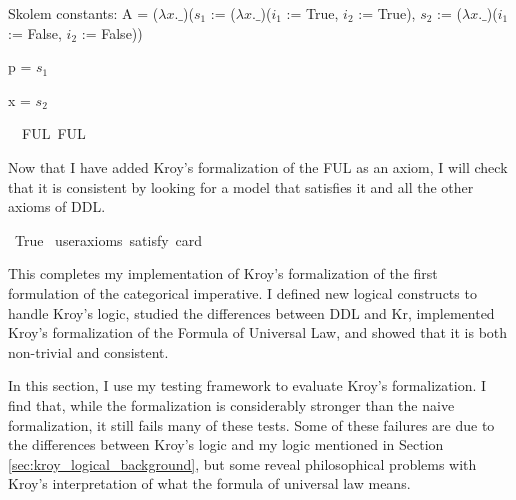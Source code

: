 \begin{isabellebody}
{  Skolem constants:
    A = ($\lambda x. \_$)($s_1$ := ($\lambda x. \_$)($i_1$ := True, $i_2$ := True), $s_2$ := ($\lambda x. \_$)($i_1$ := False, $i_2$ := False))
    
p = $s_1$
    
x = $s_2$\color{black}%
}%
\endisatagproof
{\isafoldproof}%
%
\isadelimproof
%
\endisadelimproof
\isanewline
\isanewline
{}\isamarkupfalse%
\ \ FUL{\isacharcolon}\ FUL%
\begin{isamarkuptext}%
Now that I have added Kroy's formalization of the FUL as an axiom, I will check that it is 
consistent by looking for a model that satisfies it and all the other axioms of DDL.%
\end{isamarkuptext}\isamarkuptrue%
\isamarkupfalse%
\ True\ \isamarkupfalse%
{\isacharbrackleft}user{\isacharunderscore}axioms{\isacharcomma}\ satisfy{\isacharcomma}\ card{\isacharequal}{}{\isacharbrackright}%
\isadelimproof
\ %
\endisadelimproof
%
\isatagproof
{}\isamarkupfalse%
\isanewline
%
%
\endisatagproof
{\isafoldproof}%
%
\isadelimproof
%
\endisadelimproof
%
\begin{isamarkuptext}%
This completes my implementation of Kroy's formalization of the first formulation of the 
categorical imperative. I defined new logical constructs to handle Kroy's logic, studied the differences
between DDL and Kr, implemented Kroy's formalization of the Formula of Universal Law, and showed 
that it is both non-trivial and consistent.%
\end{isamarkuptext}\isamarkuptrue%
%
\isadelimdocument
%
\endisadelimdocument
%
\isatagdocument
%
\isamarkuptrue%
%
\endisatagdocument
{\isafolddocument}%
%
\isadelimdocument
%
\endisadelimdocument
%
\begin{isamarkuptext}%
In this section, I use my testing framework to evaluate Kroy's formalization. I find that, while 
        the formalization is considerably
        stronger than the naive formalization, it still fails many of these tests. Some of these failures 
        are due to the differences between Kroy's logic and my logic mentioned in Section \ref{sec:kroy_logical_background}, but some 
        reveal philosophical problems with Kroy's interpretation of what the formula of universal law means.


\end{isamarkuptext}
\end{isabellebody}
